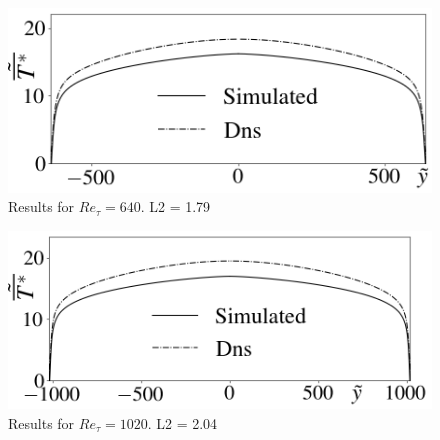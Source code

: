 \documentclass[xcolor=dvipsnames,8pt,aspectratio=34]{beamer}
\begin{document}
\begin{frame}
\begin{minipage}[h!]{0.5\textwidth}
\begin{figure}
					\centering
					\includegraphics[angle=0, scale=0.24]{fotos_formatacao_final/Temperature_640_071_classico}
					\caption{Results for $Re_\tau = 640$. L2 = 1.79 }
				\end{figure}
			\end{minipage}
			\begin{minipage}[h!]{0.49\textwidth}
				\begin{figure}
					\centering
					\includegraphics[angle=0, scale=0.24]{fotos_formatacao_final/Temperature_1000_071_classico}
					\caption{Results for $Re_\tau = 1020$. L2 = 2.04}
				\end{figure}
			\end{minipage}		
		\end{frame}
	
	
	
	
		
\end{document}
